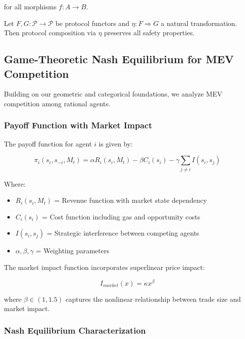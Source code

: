 \documentclass[12pt]{article}
\begin{document}
for all morphisms $f: A \to B$.

\begin{theorem}
Let $F, G: \mathcal{P} \to \mathcal{P}$ be protocol functors and $\eta: F \Rightarrow G$ a natural transformation. Then protocol composition via $\eta$ preserves all safety properties.
\end{theorem}

\subsection{Game-Theoretic Nash Equilibrium for MEV Competition}

Building on our geometric and categorical foundations, we analyze MEV competition among rational agents.

\subsubsection{Payoff Function with Market Impact}

The payoff function for agent $i$ is given by:

\begin{equation}
\pi_i(s_i, s_{-i}, M_t) = \alpha R_i(s_i, M_t) - \beta C_i(s_i) - \gamma \sum_{j \neq i} I(s_i, s_j)
\end{equation}

Where:
\begin{itemize}
    \item $R_i(s_i, M_t)$ = Revenue function with market state dependency
    \item $C_i(s_i)$ = Cost function including gas and opportunity costs  
    \item $I(s_i, s_j)$ = Strategic interference between competing agents
    \item $\alpha, \beta, \gamma$ = Weighting parameters
\end{itemize}

The market impact function incorporates superlinear price impact:

\begin{equation}
I_{market}(x) = \kappa x^{\beta}
\end{equation}

where $\beta \in (1, 1.5)$ captures the nonlinear relationship between trade size and market impact.

\subsubsection{Nash Equilibrium Characterization}
\end{document}
